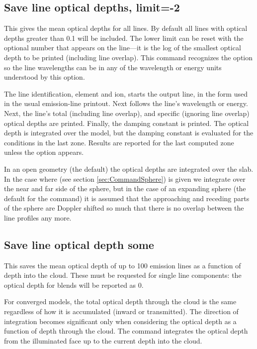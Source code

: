 \subsection{Save line optical depths, limit=-2}

This gives the mean optical depths for all lines.  By default all lines
with optical depths greater than 0.1 will be included.  The lower limit
can be reset with the optional number that appears on the line---it is the
log of the smallest optical depth to be printed (including line overlap).
This command recognizes the  option so the line
wavelengths can be in any of the wavelength or energy units
understood by this option.

The line identification, element and ion, starts the output line, in
the form used in the usual emission-line printout.
Next follows the line's wavelength or energy.
Next, the line's total (including line overlap), and
specific (ignoring line overlap) optical depths are printed.
Finally, the damping constant is printed.
The optical depth is integrated over the model,
but the damping constant is evaluated for the
conditions in the last zone.
Results are reported for the last computed zone unless the  option
appears.

In an open geometry (the default) the optical depths are integrated over the slab.
In the case where  
(see section \ref{sec:CommandSphere}) is given we integrate over 
the near and far side
of the sphere, but in the case of an expanding sphere 
(the default for the  command) it is assumed that the 
approaching and receding parts of the sphere are Doppler shifted so much 
that there is no overlap between the line profiles any more.


\subsection{Save line optical depth some}

This saves the mean optical depth of up to 100 emission lines as a
function of depth into the cloud.  These must be requested for single
line components: the optical depth for blends will be reported as 0.

For converged models, the total optical depth through the cloud is the same
regardless of how it is accumulated (inward or transmitted).
The direction of integration becomes significant only when
considering the optical depth as a function of depth through
the cloud.
The command integrates the optical depth from
the illuminated face up to the current depth into the cloud.

